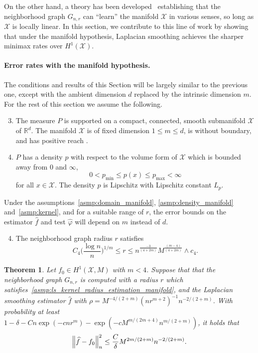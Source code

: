 \documentclass[twoside]{article}
\newcommand{\Reals}{\mathbb{R}}
\newcommand{\1}{\mathbf{1}}
\newcommand{\Xset}{\mathcal{X}}
\newcommand{\wh}[1]{\widehat{#1}}
\newtheorem{theorem}{Theorem}
\theoremstyle{definition}
\theoremstyle{remark}
\begin{document}
On the other hand, a theory has been developed~\citep{belkin03,belkin05,niyogi2013} establishing that the neighborhood graph $G_{n,r}$ can ``learn'' the manifold $\Xset$ in various senses, so long as $\Xset$ is locally linear. In this section, we contribute to this line of work by showing that under the manifold hypothesis, Laplacian smoothing achieves the sharper minimax rates over $H^1(\Xset)$.

\paragraph{Error rates with the manifold hypothesis.}
The conditions and results of this Section will be largely similar to the previous one, except with the ambient dimension $d$ replaced by the intrinsic dimension $m$. For the rest of this section we assume the following.
\begin{enumerate}[label=(P\arabic*)]
	\setcounter{enumi}{2}
	\item 
	\label{asmp:domain_manifold}
	The measure $P$ is supported on a compact, connected, smooth submanifold $\Xset$ of $\Reals^d$. The manifold $\Xset$ is of fixed dimension $1 \leq m \leq d$, is without boundary, and has positive reach \citep{federer1959}.
	\item 
	\label{asmp:density_manifold} $P$ has a density $p$ with respect to the volume form of $\Xset$ which is bounded away from $0$ and $\infty$,
	\begin{equation*}
	0 < p_{\min} \leq p(x) \leq p_{\max} < \infty
	\end{equation*}
	for all $x \in \Xset$. The density $p$ is Lipschitz with Lipschitz constant $L_p$.
\end{enumerate}
Under the assumptions~\ref{asmp:domain_manifold}, \ref{asmp:density_manifold} and~\ref{asmp:kernel}, and for a suitable range of $r$, the error bounds on the estimator $\wh{f}$ and test $\wh{\varphi}$ will depend on $m$ instead of $d$. 

\begin{enumerate}[label=(R\arabic*)]
	\setcounter{enumi}{3}
	\item 
	\label{asmp:ls_kernel_radius_estimation_manifold}
	The neighborhood graph radius $r$ satisfies
	\begin{equation*}
	C_4\biggl(\frac{\log n}{n}\biggr)^{1/m} \leq r \leq n^{\frac{-3}{(4 + 2m)}} M^{\frac{(m - 4)}{(4 + 2m)}} \wedge c_4.
	\end{equation*}
\end{enumerate}
\begin{theorem}
	\label{thm:laplacian_smoothing_estimation_manifold}
	Let $f_0 \in H^1(\Xset,M)$ with $m < 4$. Suppose that that the neighborhood graph $G_{n,r}$ is computed with a radius $r$ which satisfies~\ref{asmp:ls_kernel_radius_estimation_manifold},  and the Laplacian smoothing estimator $\wh{f}$ with $\rho = M^{-4/(2 + m)} (nr^{m + 2})^{-1} n^{-2/(2 + m)}$. With probability at least $1 - \delta -  Cn\exp(-cnr^m) - \exp(-c M^{m/(2m + 4)} n^{m/(2+m)})$, it holds that
	\begin{equation*}
	\Bigl\|\wh{f} - f_0\Bigr\|_n^2 \leq \frac{C}{\delta} M^{2m/(2 + m)} n^{-2/(2 + m)}.
	\end{equation*}
\end{theorem}
\end{document}
